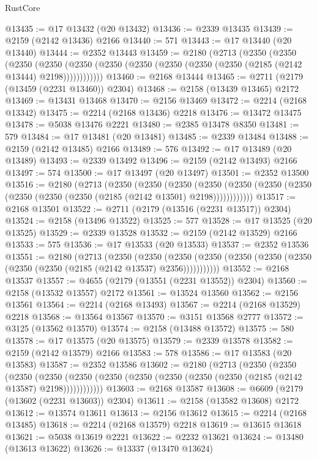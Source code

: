 \begin{lexlean}{RustCore}
\begin{coremodule}
@13435 := @17 @13432 (@20 @13432)
@13436 := @2339 @13435
@13439 := @2159 (@2142 @13436) @2166
@13440 := 571
@13443 := @17 @13440 (@20 @13440)
@13444 := @2352 @13443
@13459 := @2180
    (@2713
      (@2350
        (@2350
          (@2350
            (@2350 (@2350 (@2350 (@2350 (@2350 (@2350 (@2350 (@2185 (@2142 @13444) @2198))))))))))))
@13460 := @2168 @13444
@13465 := @2711 (@2179 (@13459 (@2231 @13460)) @2304)
@13468 := @2158 (@13439 @13465) @2172
@13469 := @13431 @13468
@13470 := @2156 @13469
@13472 := @2214 (@2168 @13342)
@13475 := @2214 (@2168 @13436) @2218
@13476 := @13472 @13475
@13478 := @5038 @13476 @2221
@13480 := @2385 @13478 @8350
@13481 := 579
@13484 := @17 @13481 (@20 @13481)
@13485 := @2339 @13484
@13488 := @2159 (@2142 @13485) @2166
@13489 := 576
@13492 := @17 @13489 (@20 @13489)
@13493 := @2339 @13492
@13496 := @2159 (@2142 @13493) @2166
@13497 := 574
@13500 := @17 @13497 (@20 @13497)
@13501 := @2352 @13500
@13516 := @2180
    (@2713
      (@2350
        (@2350
          (@2350
            (@2350 (@2350 (@2350 (@2350 (@2350 (@2350 (@2350 (@2185 (@2142 @13501) @2198))))))))))))
@13517 := @2168 @13501
@13522 := @2711 (@2179 (@13516 (@2231 @13517)) @2304)
@13524 := @2158 (@13496 @13522)
@13525 := 577
@13528 := @17 @13525 (@20 @13525)
@13529 := @2339 @13528
@13532 := @2159 (@2142 @13529) @2166
@13533 := 575
@13536 := @17 @13533 (@20 @13533)
@13537 := @2352 @13536
@13551 := @2180
    (@2713
      (@2350
        (@2350
          (@2350 (@2350 (@2350 (@2350 (@2350 (@2350 (@2350 (@2185 (@2142 @13537) @2356)))))))))))
@13552 := @2168 @13537
@13557 := @4655 (@2179 (@13551 (@2231 @13552)) @2304)
@13560 := @2158 (@13532 @13557) @2172
@13561 := @13524 @13560
@13562 := @2156 @13561
@13564 := @2214 (@2168 @13493)
@13567 := @2214 (@2168 @13529) @2218
@13568 := @13564 @13567
@13570 := @3151 @13568 @2777
@13572 := @3125 (@13562 @13570)
@13574 := @2158 (@13488 @13572)
@13575 := 580
@13578 := @17 @13575 (@20 @13575)
@13579 := @2339 @13578
@13582 := @2159 (@2142 @13579) @2166
@13583 := 578
@13586 := @17 @13583 (@20 @13583)
@13587 := @2352 @13586
@13602 := @2180
    (@2713
      (@2350
        (@2350
          (@2350
            (@2350 (@2350 (@2350 (@2350 (@2350 (@2350 (@2350 (@2185 (@2142 @13587) @2198))))))))))))
@13603 := @2168 @13587
@13608 := @6609 (@2179 (@13602 (@2231 @13603)) @2304)
@13611 := @2158 (@13582 @13608) @2172
@13612 := @13574 @13611
@13613 := @2156 @13612
@13615 := @2214 (@2168 @13485)
@13618 := @2214 (@2168 @13579) @2218
@13619 := @13615 @13618
@13621 := @5038 @13619 @2221
@13622 := @2232 @13621
@13624 := @13480 (@13613 @13622)
@13626 := @13337 (@13470 @13624)

\end{coremodule}
\end{lexlean}
